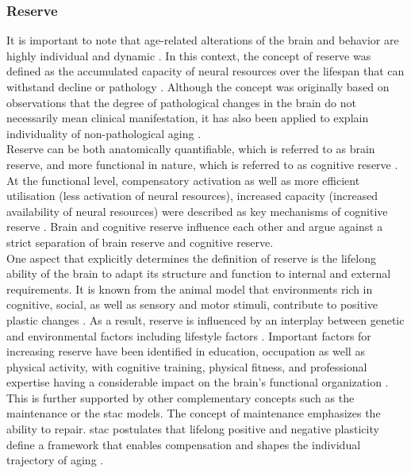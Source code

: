 \subsubsection{Reserve}
\label{theory:aging:reserve}
It is important to note that age-related alterations of the brain and behavior are highly individual and dynamic \cite{Smith2020,Koen2019,Douw2014}. In this context, the concept of reserve was defined as the accumulated capacity of neural resources over the lifespan that can withstand decline or pathology \cite{Cabeza2018, Stern2009}. Although the concept was originally based on observations that the degree of pathological changes in the brain do not necessarily mean clinical manifestation, it has also been applied to explain individuality of non-pathological aging \cite{Esiri2001,Cabeza2018,Stern2009}.\\
Reserve can be both anatomically quantifiable, which is referred to as brain reserve, and more functional in nature, which is referred to as cognitive reserve \cite{Stern2009}. At the functional level, compensatory activation as well as more efficient utilisation (less activation of neural resources), increased capacity (increased availability of neural resources) were described as key mechanisms of cognitive reserve \cite{Stern2004,Stern2009}. Brain and cognitive reserve influence each other and \citeauthor{Cabeza2018} \cite{Cabeza2018} argue against a strict separation of brain reserve and cognitive reserve.\\
One aspect that explicitly determines the definition of reserve is the lifelong ability of the brain to adapt its structure and function to internal and external requirements. It is known from the animal model that environments rich in cognitive, social, as well as sensory and motor stimuli, contribute to positive plastic changes \cite{Fabel2009}. As a result, reserve is influenced by an interplay between genetic and environmental factors including lifestyle factors \cite{Cabeza2018}. Important factors for increasing reserve have been identified in education, occupation as well as physical activity, with cognitive training, physical fitness, and professional expertise having a considerable impact on the brain's functional organization \cite{vieluf2018age,VOSS2016113,Soldan2021}.\\
This is further supported by other complementary concepts such as the maintenance or the \gls{stac} models. The concept of maintenance emphasizes the ability to repair. \Gls{stac} postulates that lifelong positive and negative plasticity define a framework that enables compensation and shapes the individual trajectory of aging \cite{Reuter-Lorenz2014}. 

